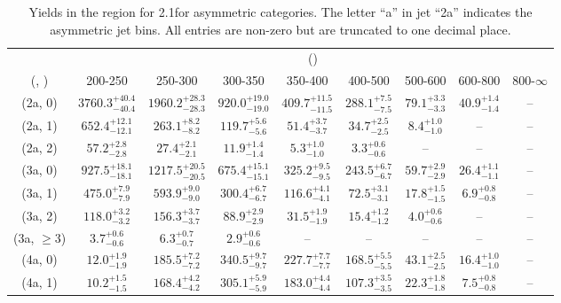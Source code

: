 \begin{table}[h!]
\tiny
\centering
\caption{Yields in the \mj region for 2.1\ifb for asymmetric categories. The letter ``a'' in jet \eg ``2a''  indicates the asymmetric jet bins. All entries are non-zero but are truncated to one decimal place.\label{tab:yieldsnodata_mu_comb_asym}}
\begin{tabular}
{ccccccccc}
	\hline\hline
	& \multicolumn{8}{c}{\scalht (\gev)} \\ 
	 (\njet,  \nb) & 200-250 & 250-300 & 300-350 & 350-400 & 400-500 & 500-600 & 600-800 & 800-$\infty$ \\ [0.8ex] 
\hline
	(2a, 0) & $3760.3^{+ 40.4 }_{- 40.4 }$ & $1960.2^{+ 28.3 }_{- 28.3 }$ & $920.0^{+ 19.0 }_{- 19.0 }$ & $409.7^{+ 11.5 }_{- 11.5 }$ & $288.1^{+ 7.5 }_{- 7.5 }$ & $79.1^{+ 3.3 }_{- 3.3 }$ & $40.9^{+ 1.4 }_{- 1.4 }$ & -- \\[0.5ex] 
	(2a, 1) & $652.4^{+ 12.1 }_{- 12.1 }$ & $263.1^{+ 8.2 }_{- 8.2 }$ & $119.7^{+ 5.6 }_{- 5.6 }$ & $51.4^{+ 3.7 }_{- 3.7 }$ & $34.7^{+ 2.5 }_{- 2.5 }$ & $8.4^{+ 1.0 }_{- 1.0 }$ & -- & -- \\[0.5ex] 
	(2a, 2) & $57.2^{+ 2.8 }_{- 2.8 }$ & $27.4^{+ 2.1 }_{- 2.1 }$ & $11.9^{+ 1.4 }_{- 1.4 }$ & $5.3^{+ 1.0 }_{- 1.0 }$ & $3.3^{+ 0.6 }_{- 0.6 }$ & -- & -- & -- \\[0.5ex] 
	(3a, 0) & $927.5^{+ 18.1 }_{- 18.1 }$ & $1217.5^{+ 20.5 }_{- 20.5 }$ & $675.4^{+ 15.1 }_{- 15.1 }$ & $325.2^{+ 9.5 }_{- 9.5 }$ & $243.5^{+ 6.7 }_{- 6.7 }$ & $59.7^{+ 2.9 }_{- 2.9 }$ & $26.4^{+ 1.1 }_{- 1.1 }$ & -- \\[0.5ex] 
	(3a, 1) & $475.0^{+ 7.9 }_{- 7.9 }$ & $593.9^{+ 9.0 }_{- 9.0 }$ & $300.4^{+ 6.7 }_{- 6.7 }$ & $116.6^{+ 4.1 }_{- 4.1 }$ & $72.5^{+ 3.1 }_{- 3.1 }$ & $17.8^{+ 1.5 }_{- 1.5 }$ & $6.9^{+ 0.8 }_{- 0.8 }$ & -- \\[0.5ex] 
	(3a, 2) & $118.0^{+ 3.2 }_{- 3.2 }$ & $156.3^{+ 3.7 }_{- 3.7 }$ & $88.9^{+ 2.9 }_{- 2.9 }$ & $31.5^{+ 1.9 }_{- 1.9 }$ & $15.4^{+ 1.2 }_{- 1.2 }$ & $4.0^{+ 0.6 }_{- 0.6 }$ & -- & -- \\[0.5ex] 
	(3a, $\ge3$) & $3.7^{+ 0.6 }_{- 0.6 }$ & $6.3^{+ 0.7 }_{- 0.7 }$ & $2.9^{+ 0.6 }_{- 0.6 }$ & -- & -- & -- & -- & -- \\[0.5ex] 
	(4a, 0) & $12.0^{+ 1.9 }_{- 1.9 }$ & $185.5^{+ 7.2 }_{- 7.2 }$ & $340.5^{+ 9.7 }_{- 9.7 }$ & $227.7^{+ 7.7 }_{- 7.7 }$ & $168.5^{+ 5.5 }_{- 5.5 }$ & $43.1^{+ 2.5 }_{- 2.5 }$ & $16.4^{+ 1.0 }_{- 1.0 }$ & -- \\[0.5ex] 
	(4a, 1) & $10.2^{+ 1.5 }_{- 1.5 }$ & $168.4^{+ 4.2 }_{- 4.2 }$ & $305.1^{+ 5.9 }_{- 5.9 }$ & $183.0^{+ 4.4 }_{- 4.4 }$ & $107.3^{+ 3.5 }_{- 3.5 }$ & $22.3^{+ 1.8 }_{- 1.8 }$ & $7.5^{+ 0.8 }_{- 0.8 }$ & -- \\[0.5ex] 

\end{tabular}
\end{table}
